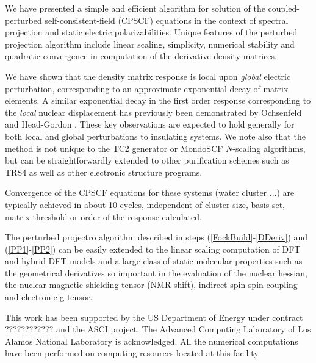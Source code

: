 \documentclass[prl,aps,twocolumn,showpacs,twocolumngrid,superbib]{revtex4}
\begin{document}
We have presented a simple and efficient algorithm for solution 
of the coupled-perturbed self-consistent-field (CPSCF) equations 
in the context of spectral projection and static
electric polarizabilities. Unique features of the perturbed 
projection algorithm include linear scaling, simplicity, numerical 
stability and quadratic convergence in computation of the derivative
density matrices.

We have shown that the density matrix response is local 
upon {\em global} electric perturbation, corresponding to an approximate 
exponential decay of matrix elements. A similar exponential decay
in the first order response corresponding to the {\em local} nuclear 
displacement has previously been demonstrated by Ochsenfeld and 
Head-Gordon \cite{Ochsenfeld97}. These key observations are expected to
hold generally for both local and global perturbations to insulating systems.  
We note also that the method is not unique to the TC2 generator or 
{\sc MondoSCF} $N$-scaling algorithms, but can be straightforwardly 
extended to other purification schemes such as TRS4 \cite{ANiklasson03} as
well as other electronic structure programs.

Convergence of the CPSCF equations for these systems (water cluster ...)
are typically achieved in about 10 cycles, independent of cluster size, basis set,
matrix threshold or order of the response calculated.

The perturbed projectro algorithm described in steps (\ref{FockBuild}-\ref{DDeriv}) and 
(\ref{PP1}-\ref{PP2})
can be easily extended to the linear scaling computation of
DFT and hybrid DFT models and a large class of static molecular properties
such as the geometrical derivatives so important
in the evaluation of the nuclear hessian, the nuclear magnetic
shielding tensor (NMR shift), indirect spin-spin coupling and
electronic g-tensor.


\begin{acknowledgments}
 This work has been supported by the US Department of Energy 
 under contract ???????????? and the ASCI project.  
 The Advanced Computing Laboratory of Los 
 Alamos National Laboratory is acknowledged.
 All the numerical computations have been
 performed on computing resources located at this facility.
\end{acknowledgments}

\end{document}
